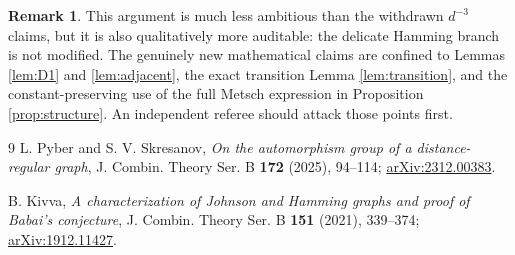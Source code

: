 \documentclass[11pt]{amsart}
\theoremstyle{definition}
\newtheorem{remark}[theorem]{Remark}
\begin{document}
\begin{remark}
This argument is much less ambitious than the withdrawn $d^{-3}$ claims, but it is also qualitatively more auditable: the delicate Hamming branch is not modified.  The genuinely new mathematical claims are confined to Lemmas \ref{lem:D1} and \ref{lem:adjacent}, the exact transition Lemma \ref{lem:transition}, and the constant-preserving use of the full Metsch expression in Proposition \ref{prop:structure}.  An independent referee should attack those points first.
\end{remark}

\begin{thebibliography}{9}
L. Pyber and S. V. Skresanov,
\emph{On the automorphism group of a distance-regular graph},
J. Combin. Theory Ser. B \textbf{172} (2025), 94--114;
\href{https://arxiv.org/abs/2312.00383}{arXiv:2312.00383}.

B. Kivva,
\emph{A characterization of Johnson and Hamming graphs and proof of Babai's conjecture},
J. Combin. Theory Ser. B \textbf{151} (2021), 339--374;
\href{https://arxiv.org/abs/1912.11427}{arXiv:1912.11427}.
\end{thebibliography}
\end{document}
